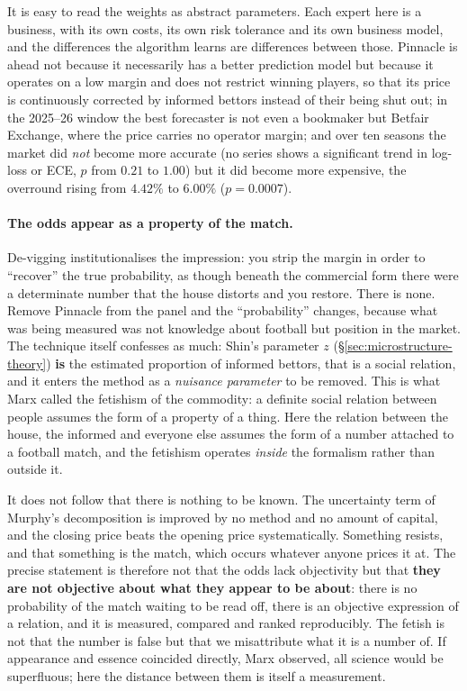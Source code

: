 \documentclass[12pt,a4paper,oneside]{report}
\renewcommand{\_}{\oldunderscore\allowbreak}
\theoremstyle{definition}
\theoremstyle{plain}
\theoremstyle{remark}
\begin{document}
It is easy to read the weights as abstract parameters. Each expert here is a business, with its
own costs, its own risk tolerance and its own business model, and the differences the algorithm
learns are differences between those. Pinnacle is ahead not because it necessarily has a better
prediction model but because it operates on a low margin and does not restrict winning players,
so that its price is continuously corrected by informed bettors instead of their being shut out;
in the 2025--26 window the best forecaster is not even a bookmaker but Betfair Exchange, where
the price carries no operator margin; and over ten seasons the market did \emph{not} become more
accurate (no series shows a significant trend in log-loss or ECE, $p$ from $0.21$ to $1.00$) but
it did become more expensive, the overround rising from $4.42\%$ to $6.00\%$ ($p=0.0007$).

\paragraph{The odds appear as a property of the match.} De-vigging institutionalises the
impression: you strip the margin in order to ``recover'' the true probability, as though beneath
the commercial form there were a determinate number that the house distorts and you restore.
There is none. Remove Pinnacle from the panel and the ``probability'' changes, because what was
being measured was not knowledge about football but position in the market. The technique itself
confesses as much: Shin's parameter $z$ (\S\ref{sec:microstructure-theory}) \textbf{is} the
estimated proportion of informed bettors, that is a social relation, and it enters the method as
a \emph{nuisance parameter} to be removed. This is what Marx called the fetishism of the
commodity: a definite social relation between people assumes the form of a property of a thing.
Here the relation between the house, the informed and everyone else assumes the form of a number
attached to a football match, and the fetishism operates \emph{inside} the formalism rather than
outside it.

It does not follow that there is nothing to be known. The uncertainty term of Murphy's
decomposition is improved by no method and no amount of capital, and the closing price beats the
opening price systematically. Something resists, and that something is the match, which occurs
whatever anyone prices it at. The precise statement is therefore not that the odds lack
objectivity but that \textbf{they are not objective about what they appear to be about}: there is
no probability of the match waiting to be read off, there is an objective expression of a
relation, and it is measured, compared and ranked reproducibly. The fetish is not that the number
is false but that we misattribute what it is a number of. If appearance and essence coincided
directly, Marx observed, all science would be superfluous; here the distance between them is
itself a measurement.
\end{document}
